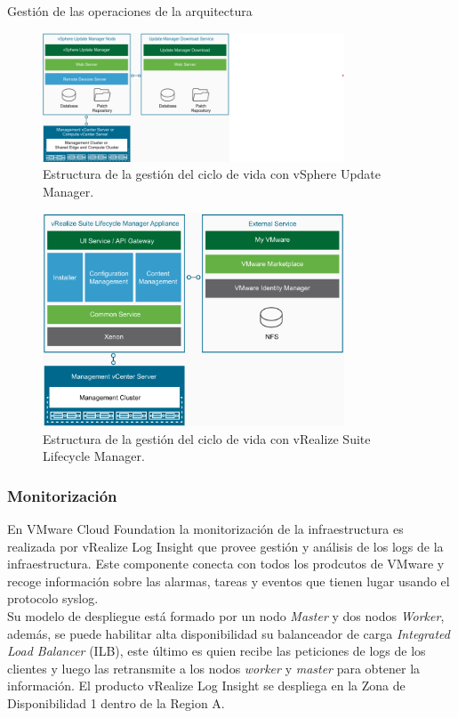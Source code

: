 \begin{subsection}{Gestión de las operaciones de la arquitectura}
\begin{figure}[h!]
  \centering
  \includegraphics[width=0.8\textwidth]{imaxes/conceptosPrevios/vSphereUpdate.png}
  \caption{Estructura de la gestión del ciclo de vida con vSphere Update Manager.}
  \label{fig:updateManager}
\end{figure}
\begin{figure}[h!]
  \centering
  \includegraphics[width=0.8\textwidth]{imaxes/conceptosPrevios/vRealizeUpdateArchLifeCyle.png}
  \caption{Estructura de la gestión del ciclo de vida con vRealize Suite Lifecycle Manager.}
  \label{fig:vrealizeUpdateManager}
\end{figure}
\FloatBarrier

\subsubsection{Monitorización}
En VMware Cloud Foundation la monitorización de la infraestructura es realizada por vRealize Log Insight que provee gestión y análisis de los logs de la infraestructura. Este componente conecta con todos los prodcutos de VMware y recoge información sobre las alarmas, tareas y eventos que tienen lugar usando el protocolo syslog.\\

Su modelo de despliegue está formado por un nodo \textit{Master} y dos nodos \textit{Worker}, además, se puede habilitar alta disponibilidad su balanceador de carga \textit{Integrated Load Balancer} (ILB), este último es quien recibe las peticiones de logs de los clientes y luego las retransmite a los nodos \textit{worker} y \textit{master} para obtener la información. El producto vRealize Log Insight se despliega en la Zona de Disponibilidad 1 dentro de la Region A.





\end{subsection}


